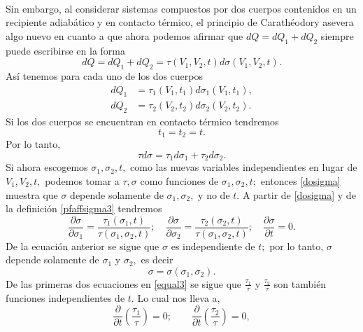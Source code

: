 \documentclass{article}
\theoremstyle{definition} \newtheorem{defi}{Definici\'on}
\theoremstyle{definition} \newtheorem{teo}{Teorema}
\theoremstyle{definition} \newtheorem{cor}{Corolario}
\begin{document}
\paragraph{}
Sin embargo, al considerar sistemas compuestos por dos cuerpos contenidos en un recipiente adiab\'atico y en contacto t\'ermico, el principio de Carath\'eodory asevera algo nuevo en cuanto a que ahora podemos afirmar que $dQ=dQ_1+dQ_2$ siempre puede escribirse en la forma
\begin{equation}
dQ=dQ_1+dQ_2=\tau (V_1,V_2,t)d\sigma(V_1,V_2,t).
\end{equation}
As\'i tenemos para cada uno de los dos cuerpos
\begin{align}
dQ_1&=\tau_1 (V_1,t_1)d\sigma_1(V_1,t_1),\nonumber\\
dQ_2&=\tau_2 (V_2,t_2)d\sigma_2(V_2,t_2).
\end{align}
Si los dos cuerpos se encuentran en contacto t\'ermico tendremos
\begin{equation}
t_1=t_2=t.
\end{equation}
Por lo tanto,
\begin{equation}\label{dosigma}
\tau d\sigma = \tau_1 d\sigma_1 + \tau_2 d\sigma_2.
\end{equation}
Si ahora escogemos $\sigma_1,\sigma_2,t,$ como las nuevas variables independientes en lugar de $V_1,V_2,t,$ podemos tomar a $\tau,\sigma$ como funciones de $\sigma_1,\sigma_2,t;$ entonces \eqref{dosigma} muestra que $\sigma$ depende solamente de $\sigma_1,\sigma_2,$ y no de $t.$ A partir de \eqref{dosigma} y de la definici\'on \eqref{pfaffsigma3} tendremos
\begin{equation}\label{equal3}
\frac{\partial \sigma}{\partial \sigma_1}=\frac{\tau_1 (\sigma_1,t)}{\tau (\sigma_1,\sigma_2,t)}; \quad \frac{\partial \sigma}{\partial \sigma_2}=\frac{\tau_2 (\sigma_2,t)}{\tau (\sigma_1,\sigma_2,t)}; \quad \frac{\partial \sigma}{\partial t}=0.
\end{equation}
De la ecuaci\'on anterior se sigue que $\sigma$ es independiente de $t;$ por lo tanto, $\sigma$ depende solamente de $\sigma_1$ y $\sigma_2,$ es decir
\begin{equation}
\sigma = \sigma (\sigma_1,\sigma_2).
\end{equation}
De las primeras dos ecuaciones en \eqref{equal3} se sigue que $\frac{\tau_1}{\tau}$ y $\frac{\tau_2}{\tau}$ son tambi\'en funciones independientes de $t.$ Lo cual nos lleva a,
\begin{equation}
\frac{\partial}{\partial t}\left(\frac{\tau_1}{\tau}\right)=0; \qquad \frac{\partial}{\partial t}\left(\frac{\tau_2}{\tau}\right)=0,
\end{equation}
\end{document}
